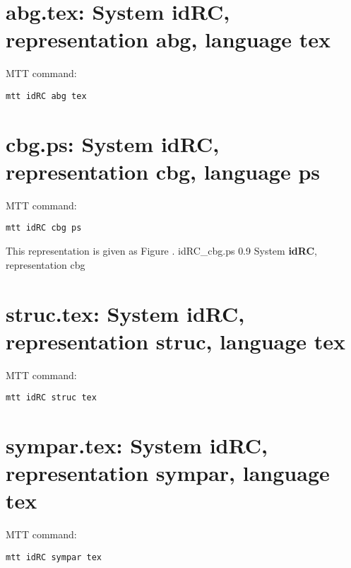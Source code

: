 

\section{\textbf{abg.tex}: System idRC, representation \textbf{abg}, language \textbf{tex}}
\label{sec:idRC_abg.tex}


MTT command:
\begin{verbatim}
mtt idRC abg tex 
\end{verbatim}
  


\section{\textbf{cbg.ps}: System idRC, representation \textbf{cbg}, language \textbf{ps}}
\label{sec:idRC_cbg.ps}


MTT command:
\begin{verbatim}
mtt idRC cbg ps 
\end{verbatim}
This representation is given as Figure .
    {idRC_cbg.ps}
    {0.9}
    {System \textbf{idRC}, representation cbg}


\section{\textbf{struc.tex}: System idRC, representation \textbf{struc}, language \textbf{tex}}
\label{sec:idRC_struc.tex}


MTT command:
\begin{verbatim}
mtt idRC struc tex 
\end{verbatim}
  


\section{\textbf{sympar.tex}: System idRC, representation \textbf{sympar}, language \textbf{tex}}
\label{sec:idRC_sympar.tex}


MTT command:
\begin{verbatim}
mtt idRC sympar tex 
\end{verbatim}
  


